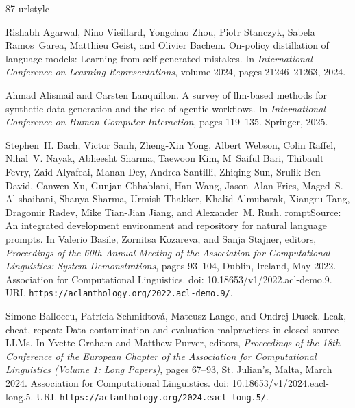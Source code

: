 \begin{thebibliography}{87}
\providecommand{\natexlab}[1]{#1}
\providecommand{\url}[1]{\texttt{#1}}
\expandafter\ifx\csname urlstyle\endcsname\relax
  \providecommand{\doi}[1]{doi: #1}\else
  \providecommand{\doi}{doi: \begingroup \urlstyle{rm}\Url}\fi

Rishabh Agarwal, Nino Vieillard, Yongchao Zhou, Piotr Stanczyk, Sabela Ramos~Garea, Matthieu Geist, and Olivier Bachem.
\newblock On-policy distillation of language models: Learning from self-generated mistakes.
\newblock In \emph{International Conference on Learning Representations}, volume 2024, pages 21246--21263, 2024.

Ahmad Alismail and Carsten Lanquillon.
\newblock A survey of llm-based methods for synthetic data generation and the rise of agentic workflows.
\newblock In \emph{International Conference on Human-Computer Interaction}, pages 119--135. Springer, 2025.

Stephen~H. Bach, Victor Sanh, Zheng-Xin Yong, Albert Webson, Colin Raffel, Nihal~V. Nayak, Abheesht Sharma, Taewoon Kim, M~Saiful Bari, Thibault Fevry, Zaid Alyafeai, Manan Dey, Andrea Santilli, Zhiqing Sun, Srulik Ben-David, Canwen Xu, Gunjan Chhablani, Han Wang, Jason~Alan Fries, Maged~S. Al-shaibani, Shanya Sharma, Urmish Thakker, Khalid Almubarak, Xiangru Tang, Dragomir Radev, Mike Tian-Jian Jiang, and Alexander~M. Rush.
rompt{S}ource: An integrated development environment and repository for natural language prompts.
\newblock In Valerio Basile, Zornitsa Kozareva, and Sanja Stajner, editors, \emph{Proceedings of the 60th Annual Meeting of the Association for Computational Linguistics: System Demonstrations}, pages 93--104, Dublin, Ireland, May 2022. Association for Computational Linguistics.
\newblock \doi{10.18653/v1/2022.acl-demo.9}.
\newblock URL \url{https://aclanthology.org/2022.acl-demo.9/}.

Simone Balloccu, Patr{\'i}cia Schmidtov{\'a}, Mateusz Lango, and Ondrej Dusek.
\newblock Leak, cheat, repeat: Data contamination and evaluation malpractices in closed-source {LLM}s.
\newblock In Yvette Graham and Matthew Purver, editors, \emph{Proceedings of the 18th Conference of the European Chapter of the Association for Computational Linguistics (Volume 1: Long Papers)}, pages 67--93, St. Julian{'}s, Malta, March 2024. Association for Computational Linguistics.
\newblock \doi{10.18653/v1/2024.eacl-long.5}.
\newblock URL \url{https://aclanthology.org/2024.eacl-long.5/}.


\end{thebibliography}

